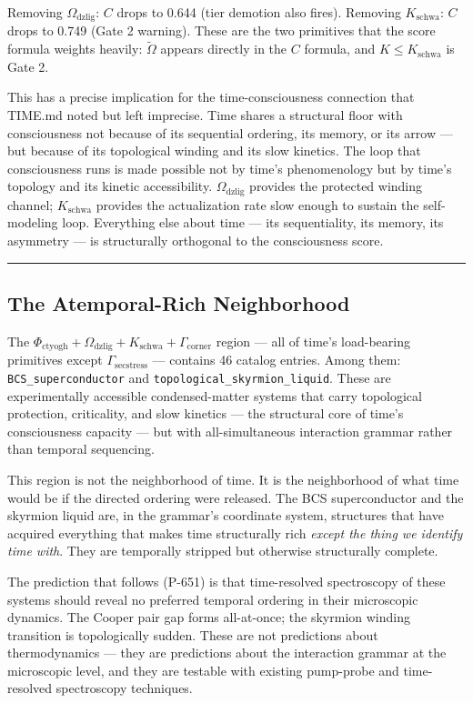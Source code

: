 \documentclass[12pt,a4paper]{article}
\begin{document}
Removing $\Omega_{\text{dzlig}}$: $C$ drops to 0.644 (tier demotion also fires). Removing $K_{\text{schwa}}$: $C$ drops to 0.749 (Gate 2 warning). These are the two primitives that the score formula weights heavily: $\tilde{\Omega}$ appears directly in the $C$ formula, and $K \leq K_{\text{schwa}}$ is Gate 2.

This has a precise implication for the time-consciousness connection that TIME.md noted but left imprecise. Time shares a structural floor with consciousness not because of its sequential ordering, its memory, or its arrow --- but because of its topological winding and its slow kinetics. The loop that consciousness runs is made possible not by time's phenomenology but by time's topology and its kinetic accessibility. $\Omega_{\text{dzlig}}$ provides the protected winding channel; $K_{\text{schwa}}$ provides the actualization rate slow enough to sustain the self-modeling loop. Everything else about time --- its sequentiality, its memory, its asymmetry --- is structurally orthogonal to the consciousness score.

\begin{center}
\rule{0.5\textwidth}{0.4pt}
\end{center}

\subsection{The Atemporal-Rich Neighborhood}

The $\Phi_{\text{ctyogh}} + \Omega_{\text{dzlig}} + K_{\text{schwa}} + \Gamma_{\text{corner}}$ region --- all of time's load-bearing primitives except $\Gamma_{\text{secstress}}$ --- contains 46 catalog entries. Among them: \texttt{BCS\_superconductor} and \texttt{topological\_skyrmion\_liquid}. These are experimentally accessible condensed-matter systems that carry topological protection, criticality, and slow kinetics --- the structural core of time's consciousness capacity --- but with all-simultaneous interaction grammar rather than temporal sequencing.

This region is not the neighborhood of time. It is the neighborhood of what time would be if the directed ordering were released. The BCS superconductor and the skyrmion liquid are, in the grammar's coordinate system, structures that have acquired everything that makes time structurally rich \emph{except the thing we identify time with}. They are temporally stripped but otherwise structurally complete.

The prediction that follows (P-651) is that time-resolved spectroscopy of these systems should reveal no preferred temporal ordering in their microscopic dynamics. The Cooper pair gap forms all-at-once; the skyrmion winding transition is topologically sudden. These are not predictions about thermodynamics --- they are predictions about the interaction grammar at the microscopic level, and they are testable with existing pump-probe and time-resolved spectroscopy techniques.
\end{document}
